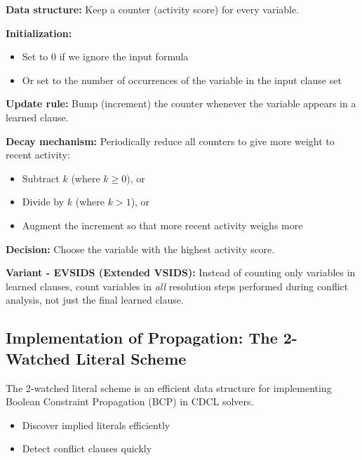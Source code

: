 \documentclass[11pt,a4paper]{article}
\theoremstyle{definition}
\theoremstyle{plain}
\theoremstyle{remark}
\begin{document}
\begin{tcolorbox}[colback=cyan!5!white,colframe=cyan!75!black,title=\textbf{VSIDS Algorithm}]
\textbf{Data structure:} Keep a counter (activity score) for every variable.

\vspace{0.5em}

\textbf{Initialization:}
\begin{itemize}
    \item Set to 0 if we ignore the input formula
    \item Or set to the number of occurrences of the variable in the input clause set
\end{itemize}

\vspace{0.5em}

\textbf{Update rule:} Bump (increment) the counter whenever the variable appears in a learned clause.

\vspace{0.5em}

\textbf{Decay mechanism:} Periodically reduce all counters to give more weight to recent activity:
\begin{itemize}
    \item Subtract $k$ (where $k \geq 0$), or
    \item Divide by $k$ (where $k > 1$), or
    \item Augment the increment so that more recent activity weighs more
\end{itemize}

\vspace{0.5em}

\textbf{Decision:} Choose the variable with the highest activity score.
\end{tcolorbox}

\textbf{Variant - EVSIDS (Extended VSIDS):} Instead of counting only variables in learned clauses, count variables in \textit{all} resolution steps performed during conflict analysis, not just the final learned clause.

\subsection{Implementation of Propagation: The 2-Watched Literal Scheme}

The 2-watched literal scheme is an efficient data structure for implementing Boolean Constraint Propagation (BCP) in CDCL solvers.

\begin{tcolorbox}[colback=purple!5!white,colframe=purple!75!black,title=\textbf{Goals of the 2-Watched Literal Scheme}]
\begin{itemize}
    \item Discover implied literals efficiently
    \item Detect conflict clauses quickly
\end{itemize}
\end{tcolorbox}
\end{document}
